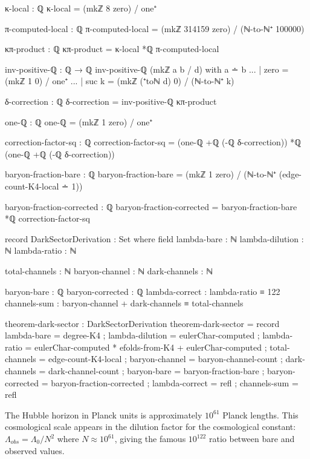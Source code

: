 \documentclass[11pt,a4paper]{book}
\def\text#1{#1}%
\begin{document}
\begin{code}
κ-local : ℚ
κ-local = (mkℤ 8 zero) / one⁺

π-computed-local : ℚ
π-computed-local = (mkℤ 314159 zero) / (ℕ-to-ℕ⁺ 100000)

κπ-product : ℚ
κπ-product = κ-local *ℚ π-computed-local

inv-positive-ℚ : ℚ → ℚ
inv-positive-ℚ (mkℤ a b / d) with a ∸ b
... | zero = (mkℤ 1 0) / one⁺
... | suc k = (mkℤ (⁺toℕ d) 0) / (ℕ-to-ℕ⁺ k)

δ-correction : ℚ
δ-correction = inv-positive-ℚ κπ-product

one-ℚ : ℚ
one-ℚ = (mkℤ 1 zero) / one⁺

correction-factor-sq : ℚ
correction-factor-sq = (one-ℚ +ℚ (-ℚ δ-correction)) *ℚ (one-ℚ +ℚ (-ℚ δ-correction))

baryon-fraction-bare : ℚ
baryon-fraction-bare = (mkℤ 1 zero) / (ℕ-to-ℕ⁺ (edge-count-K4-local ∸ 1))

baryon-fraction-corrected : ℚ
baryon-fraction-corrected = baryon-fraction-bare *ℚ correction-factor-sq
\end{code}

\begin{code}
record DarkSectorDerivation : Set where
  field
    lambda-bare : ℕ
    lambda-dilution : ℕ
    lambda-ratio : ℕ
    
    total-channels : ℕ
    baryon-channel : ℕ
    dark-channels : ℕ
    
    baryon-bare : ℚ
    baryon-corrected : ℚ
    lambda-correct : lambda-ratio ≡ 122
    channels-sum : baryon-channel + dark-channels ≡ total-channels

theorem-dark-sector : DarkSectorDerivation
theorem-dark-sector = record
  { lambda-bare = degree-K4
  ; lambda-dilution = eulerChar-computed
  ; lambda-ratio = eulerChar-computed * efolds-from-K4 + eulerChar-computed
  ; total-channels = edge-count-K4-local
  ; baryon-channel = baryon-channel-count
  ; dark-channels = dark-channel-count
  ; baryon-bare = baryon-fraction-bare
  ; baryon-corrected = baryon-fraction-corrected
  ; lambda-correct = refl
  ; channels-sum = refl
  }
\end{code}

The Hubble horizon in Planck units is approximately $10^{61}$ Planck lengths. This 
cosmological scale appears in the dilution factor for the cosmological constant: 
$\Lambda_{\text{obs}} = \Lambda_0 / N^2$ where $N \approx 10^{61}$, giving the famous 
$10^{122}$ ratio between bare and observed values.
\end{document}
